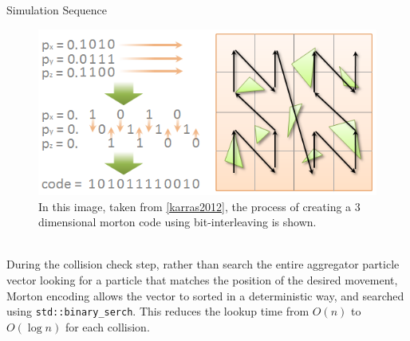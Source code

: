 \documentclass[fleqn,10pt]{UserGuideArx} %
\begin{document}
\begin{algorithm}
    \caption{Simulation Sequence}\label{alg:SimSequence}
\end{algorithm}

\begin{figure}[!h]\centering %
    \includegraphics[width=\linewidth]{images/fig04-z-curvekarras.png}
    \caption{In this image, taken from \ref{karras2012}, the process of creating a 3 dimensional morton code using bit-interleaving is shown.}
    \label{fig:KarrasMortonGeneration}
    \end{figure}

~\\
During the collision check step, rather than search the entire aggregator particle vector looking for a particle that matches the position of the desired movement, Morton encoding allows the vector to sorted in a deterministic way, and searched using \texttt{std\allowbreak::binary\_serch}. This reduces the lookup time from $O(n)$ to $O(\log n)$ for each collision.\\
\end{document}

